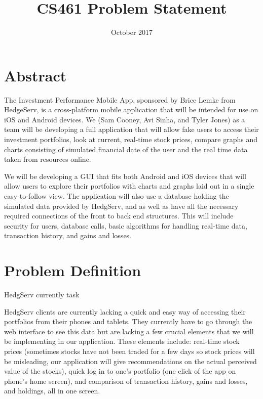 \documentclass[letterpaper,10pt,titlepage]{article}
\title{CS461 Problem Statement}
\author{\name}
\date{October 2017}
\begin{document}
\begin{titlepage}
   \maketitle
\end{titlepage}

\section{Abstract}

The Investment Performance Mobile App, sponsored by Brice Lemke from HedgeServ,
is a cross-platform mobile application that will be intended for use on
iOS and Android devices. We (Sam Cooney, Avi Sinha, and Tyler Jones) as a 
team will be developing a full application that will allow fake users to
access their investment portfolios, look at current, real-time stock prices,
compare graphs and charts consisting of simulated financial date of the user
and the real time data taken from resources online. 

We will be developing a GUI that fits both Android and iOS devices that will
allow users to explore their portfolios with charts and graphs laid out in a
single easy-to-follow view. The application will also use a database holding the 
simulated data provided by HedgServ, and as well as have all the necessary 
required connections of the front to back end structures. This will include
security for users, database calls, basic algorithms for handling
real-time data, transaction history, and gains and losses.

\section{Problem Definition}

HedgServ currently task

HedgServ clients are currently lacking a quick and easy way of accessing their
portfolios from their phones and tablets. They currently have to go through
the web interface to see this data but are lacking a few crucial elements that
we will be implementing in our application. These elements include: real-time 
stock prices (sometimes stocks have not been traded for a few days so stock 
prices will be misleading, our application will give recommendations on the
actual perceived value of the stocks), quick log in to one's portfolio (one click
of the app on phone's home screen), and comparison of transaction history, gains and losses, and holdings,
all in one screen. 
\end{document}
